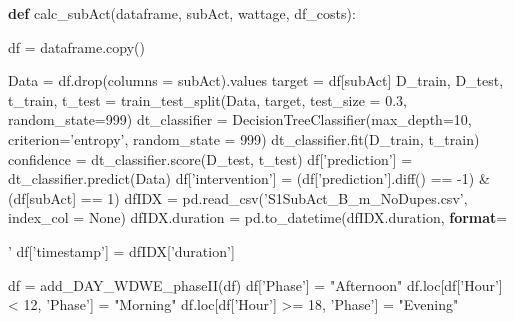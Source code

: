 \documentclass[11pt,]{article}
\newenvironment{Shaded}{\begin{snugshade}}{\end{snugshade}}
\newcommand{\BuiltInTok}[1]{\textcolor[rgb]{0.39,0.29,0.61}{\textbf{#1}}}
\newcommand{\DecValTok}[1]{\textcolor[rgb]{0.69,0.50,0.00}{#1}}
\newcommand{\FloatTok}[1]{\textcolor[rgb]{0.69,0.50,0.00}{#1}}
\newcommand{\KeywordTok}[1]{\textcolor[rgb]{0.12,0.11,0.11}{\textbf{#1}}}
\newcommand{\NormalTok}[1]{\textcolor[rgb]{0.12,0.11,0.11}{#1}}
\newcommand{\OperatorTok}[1]{\textcolor[rgb]{0.12,0.11,0.11}{#1}}
\newcommand{\SpecialCharTok}[1]{\textcolor[rgb]{0.24,0.68,0.91}{#1}}
\newcommand{\StringTok}[1]{\textcolor[rgb]{0.75,0.01,0.01}{#1}}
\newcommand{\VariableTok}[1]{\textcolor[rgb]{0.00,0.34,0.68}{#1}}
\begin{document}
\begin{Shaded}
\begin{Highlighting}[]
\KeywordTok{def}\NormalTok{ calc_subAct(dataframe, subAct, wattage, df_costs):}
    
\NormalTok{    df }\OperatorTok{=}\NormalTok{ dataframe.copy()}

\NormalTok{    Data }\OperatorTok{=}\NormalTok{ df.drop(columns }\OperatorTok{=}\NormalTok{ subAct).values}
\NormalTok{    target }\OperatorTok{=}\NormalTok{ df[subAct]}
\NormalTok{    D_train, D_test, t_train, t_test }\OperatorTok{=}\NormalTok{ train_test_split(Data, target, test_size }\OperatorTok{=} \FloatTok{0.3}\NormalTok{,}
\NormalTok{                                                        random_state}\OperatorTok{=}\DecValTok{999}\NormalTok{)}
\NormalTok{    dt_classifier }\OperatorTok{=}\NormalTok{ DecisionTreeClassifier(max_depth}\OperatorTok{=}\DecValTok{10}\NormalTok{, criterion}\OperatorTok{=}\StringTok{'entropy'}\NormalTok{,}
\NormalTok{                                           random_state }\OperatorTok{=} \DecValTok{999}\NormalTok{)}
\NormalTok{    dt_classifier.fit(D_train, t_train)}
\NormalTok{    confidence }\OperatorTok{=}\NormalTok{ dt_classifier.score(D_test, t_test)}
\NormalTok{    df[}\StringTok{'prediction'}\NormalTok{] }\OperatorTok{=}\NormalTok{ dt_classifier.predict(Data)}
\NormalTok{    df[}\StringTok{'intervention'}\NormalTok{] }\OperatorTok{=}\NormalTok{ (df[}\StringTok{'prediction'}\NormalTok{].diff() }\OperatorTok{==} \DecValTok{-1}\NormalTok{) }\OperatorTok{&}\NormalTok{ (df[subAct] }\OperatorTok{==} \DecValTok{1}\NormalTok{)}
\NormalTok{    dfIDX }\OperatorTok{=}\NormalTok{ pd.read_csv(}\StringTok{'S1SubAct_B_m_NoDupes.csv'}\NormalTok{, index_col }\OperatorTok{=} \VariableTok{None}\NormalTok{)}
\NormalTok{    dfIDX.duration }\OperatorTok{=}\NormalTok{ pd.to_datetime(dfIDX.duration, }\BuiltInTok{format}\OperatorTok{=}\StringTok{'%
\NormalTok{    df[}\StringTok{'timestamp'}\NormalTok{] }\OperatorTok{=}\NormalTok{ dfIDX[}\StringTok{'duration'}\NormalTok{]}

\NormalTok{    df }\OperatorTok{=}\NormalTok{ add_DAY_WDWE_phaseII(df)}
\NormalTok{    df[}\StringTok{'Phase'}\NormalTok{] }\OperatorTok{=} \StringTok{"Afternoon"}
\NormalTok{    df.loc[df[}\StringTok{'Hour'}\NormalTok{] }\OperatorTok{<} \DecValTok{12}\NormalTok{, }\StringTok{'Phase'}\NormalTok{] }\OperatorTok{=} \StringTok{"Morning"}
\NormalTok{    df.loc[df[}\StringTok{'Hour'}\NormalTok{] }\OperatorTok{>=} \DecValTok{18}\NormalTok{, }\StringTok{'Phase'}\NormalTok{] }\OperatorTok{=} \StringTok{"Evening"}
    
}
\end{Highlighting}
\end{Shaded}
\end{document}
